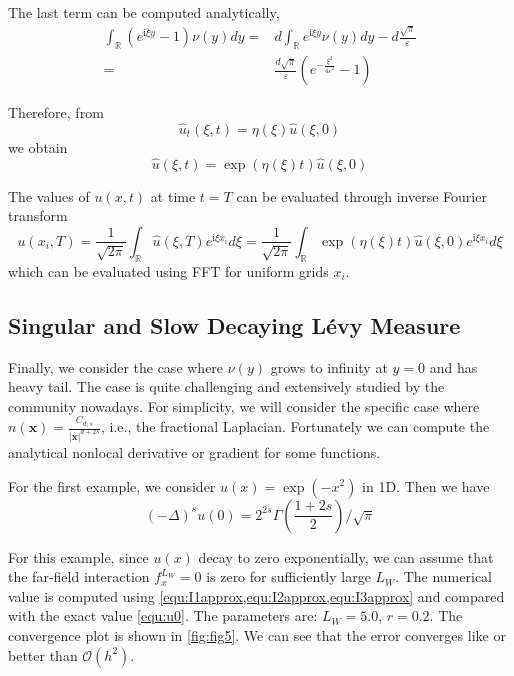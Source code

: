 \documentclass[3p,,preprint,12pt]{elsarticle}
\newcommand{\ii}[0]{\mathrm{i}}
\newcommand{\RR}[0]{\mathbb{R}}
\newcommand{\bx}[0]{\mathbf{x}}
\theoremstyle{definition}
\begin{document}
The last term can be computed analytically,
\begin{align}
	\int_{\RR} {({e^{\ii\xi y}} - 1)} \nu (y)dy =& d\int_{\RR} {{e^{\ii\xi y}}\nu (y)} dy - d\frac{{\sqrt \pi  }}{\varepsilon }\\
	 =&\frac{{ d\sqrt \pi  }}{\varepsilon }\left( {{e^{ - \frac{{{\xi ^2}}}{{4{\varepsilon ^2}}}}} - 1} \right)
\end{align}

Therefore, from 
\begin{equation}
	\hat u_t(\xi, t) = \eta(\xi) \hat u(\xi, 0)
\end{equation}
we obtain
\begin{equation}
	\hat u(\xi, t) = \exp(\eta(\xi)t)\hat u(\xi, 0)
\end{equation}

The values of $u(x,t)$ at time $t=T$ can be evaluated through inverse Fourier transform
\begin{equation}
	u(x_i, T) = \frac{1}{\sqrt{2\pi}}\int_\RR \hat u(\xi, T) e^{\ii \xi x_i} d\xi  = \frac{1}{\sqrt{2\pi}}\int_\RR  \exp(\eta(\xi)t)\hat u(\xi, 0) e^{\ii \xi x_i} d\xi 
\end{equation}
which can be evaluated using FFT for uniform grids $x_i$. 

\subsection{Singular and Slow Decaying L\'evy Measure}

Finally, we consider the case where $\nu(y)$ grows to infinity at $y=0$ and has heavy tail. The case is quite challenging and extensively studied by the community nowadays. For simplicity, we will consider the specific case where $n(\bx) = \frac{C_{d, s}}{|\bx|^{d+2s}}$, i.e., the fractional Laplacian. Fortunately we can compute  the analytical nonlocal derivative or gradient for some functions. 

For the first example, we consider $u(x)=\exp(-x^2)$ in 1D. Then we have
\begin{equation}\label{equ:u0}
	(-\Delta)^s u(0) = 2^{2s}\Gamma\left( \frac{1+2s}{2} \right)/\sqrt{\pi}
\end{equation}

For this example, since $u(x)$ decay to zero exponentially, we can assume that the far-field interaction $f^{L_W}_x=0$ is zero for sufficiently large $L_W$. The numerical value is computed using \cref{equ:I1approx,equ:I2approx,equ:I3approx} and compared with the exact value \cref{equ:u0}. The parameters are: $L_W=5.0$, $r=0.2$. The convergence plot is shown in \cref{fig:fig5}. We can see that the error converges like or better than $\mathcal{O}(h^2)$. 
\end{document}
